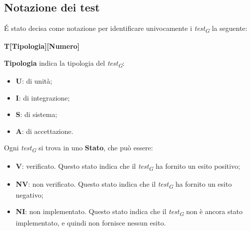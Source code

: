 \subsection{Notazione dei test}
\'E stato decisa come notazione per identificare univocamente i \textit{test\textsubscript{G}} la seguente:
\begin{center}
    \textbf{T[Tipologia][Numero]}
\end{center}
\textbf{Tipologia} indica la tipologia del \textit{test\textsubscript{G}}:
\begin{itemize}
    \item \textbf{U}: di unità;
    \item \textbf{I}: di integrazione;
    \item \textbf{S}: di sistema;
    \item \textbf{A}: di accettazione.
\end{itemize}
Ogni \textit{test\textsubscript{G}} si trova in uno \textbf{Stato}, che può essere:
\begin{itemize}
    \item \textbf{V}: verificato. Questo stato indica che il \textit{test\textsubscript{G}} ha fornito un esito positivo;
    \item \textbf{NV}: non verificato. Questo stato indica che il \textit{test\textsubscript{G}} ha fornito un esito negativo;
    \item \textbf{NI}: non implementato. Questo stato indica che il \textit{test\textsubscript{G}} non è ancora stato implementato, e quindi non fornisce nessun esito.
\end{itemize}

